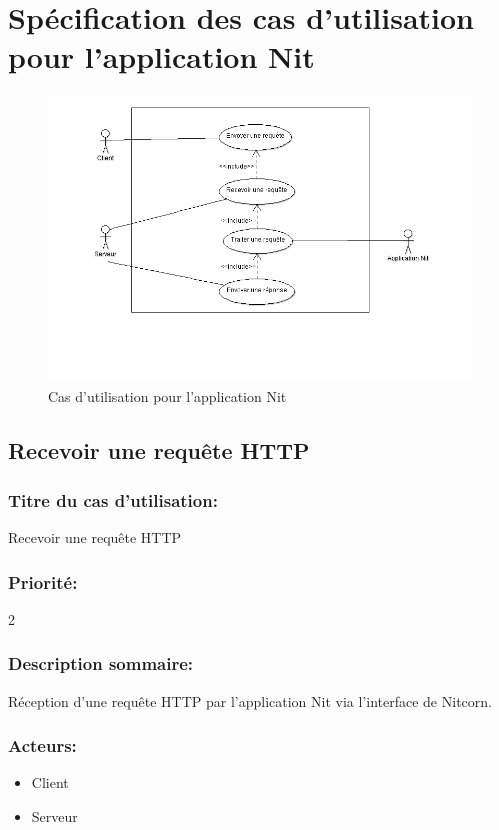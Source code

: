 \documentclass{scrreprt}
\begin{document}
\section{Spécification des cas d'utilisation pour l'application Nit}


\begin{figure}[h]
\caption{Cas d'utilisation pour l'application Nit}	
\includegraphics[width=\textwidth]{./diagram/section33.png}	
\end{figure}
\subsection{Recevoir une requête HTTP}

\subsubsection{Titre du cas d'utilisation:} Recevoir une requête HTTP
\subsubsection{Priorité:} 2

\subsubsection{Description sommaire:}
Réception d'une requête HTTP par l'application Nit via l'interface de Nitcorn.

\subsubsection{Acteurs:}
\begin{itemize}
	\item Client
    	\item Serveur
\end{itemize}
\end{document}
